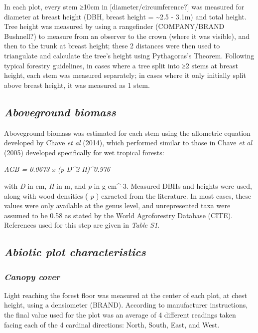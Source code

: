 \documentclass[]{article}
\begin{document}
In each plot, every stem ≥10cm in {[}diameter/circumference?{]} was
measured for diameter at breast height (DBH, breast height =
\textasciitilde{}2.5 - 3.1m) and total height. Tree height was measured
by using a rangefinder (COMPANY/BRAND Bushnell?) to measure from an
observer to the crown (where it was visible), and then to the trunk at
breast height; these 2 distances were then used to triangulate and
calculate the tree's height using Pythagoras's Theorem. Following
typical forestry guidelines, in cases where a tree split into ≥2 stems
at breast height, each stem was measured separately; in cases where it
only initially split above breast height, it was measured as 1 stem.

\hypertarget{aboveground-biomass}{%
\subsection{\texorpdfstring{\emph{Aboveground
biomass}}{Aboveground biomass}}\label{aboveground-biomass}}

Aboveground biomass was estimated for each stem using the allometric
equation developed by Chave \emph{et al} (2014), which performed similar
to those in Chave \emph{et al} (2005) developed specifically for wet
tropical forests:

\emph{AGB = 0.0673 x (p D\^{}2 H)\^{}0.976}

with \emph{D} in cm, \emph{H} in m, and \emph{p} in g cm\^{}-3. Measured
DBHs and heights were used, along with wood densities ( \emph{p} )
exracted from the literature. In most cases, these values were only
available at the genus level, and unrepresented taxa were assumed to be
0.58 as stated by the World Agroforestry Database (CITE). References
used for this step are given in \emph{Table S1}.

\hypertarget{abiotic-plot-characteristics}{%
\subsection{\texorpdfstring{\emph{Abiotic plot
characteristics}}{Abiotic plot characteristics}}\label{abiotic-plot-characteristics}}

\hypertarget{canopy-cover}{%
\subsubsection{\texorpdfstring{\emph{Canopy
cover}}{Canopy cover}}\label{canopy-cover}}

Light reaching the forest floor was measured at the center of each plot,
at chest height, using a densiometer (BRAND). According to manufacturer
instructions, the final value used for the plot was an average of 4
different readings taken facing each of the 4 cardinal directions:
North, South, East, and West.
\end{document}
